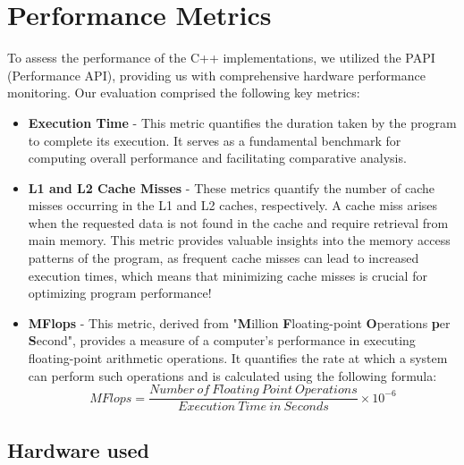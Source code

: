 \section{Performance Metrics}
\label{sec:performanceMetrics}

To assess the performance of the C++ implementations, we 
utilized the PAPI (Performance API), providing us with comprehensive 
hardware performance monitoring. Our evaluation comprised the 
following key metrics:

\begin{itemize}
\item \textbf{Execution Time} - This metric quantifies the 
duration taken by the program to 
complete its execution. It serves as a fundamental 
benchmark for computing overall performance 
and facilitating comparative analysis.

\item \textbf{L1 and L2 Cache Misses} - These metrics 
quantify the number of cache misses occurring in the 
L1 and L2 caches, respectively. A cache miss arises 
when the requested data is not found in the cache and 
require retrieval from main memory. This metric 
provides valuable insights into the memory access patterns
of the program, as frequent cache misses can lead to 
increased execution times, which means that 
minimizing cache misses is crucial for optimizing 
program performance!

\item \textbf{MFlops} - This metric, derived from "\textbf{M}illion 
\textbf{F}loating-point \textbf{O}perations \textbf{p}er \textbf{S}econd", provides a measure of a 
computer's performance in executing floating-point arithmetic 
operations. It quantifies the rate at which a system can 
perform such operations and is calculated using the following formula:
    \begin{equation}
        MFlops = \frac{Number\ of\ Floating\ Point\ Operations}{Execution\ Time\ in\ Seconds} \times 10^{-6}
    \end{equation}
\end{itemize}

\subsection{Hardware used}
